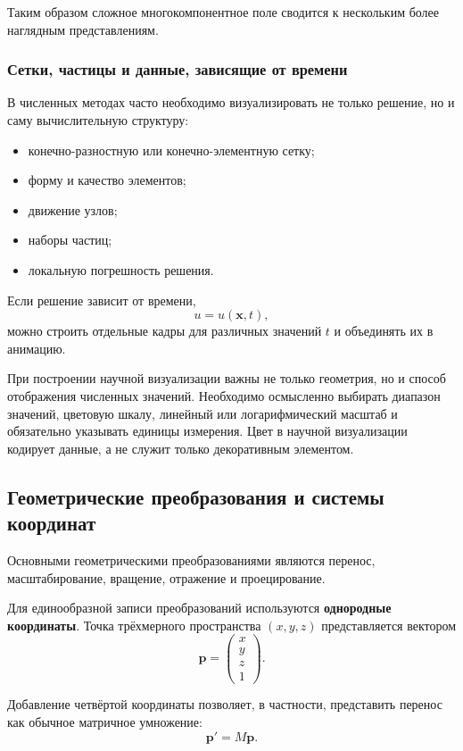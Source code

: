 Таким образом сложное многокомпонентное поле сводится к нескольким более наглядным представлениям.

\subsubsection*{Сетки, частицы и данные, зависящие от времени}

В численных методах часто необходимо визуализировать не только решение, но и саму вычислительную структуру:
\begin{itemize}
	\item конечно-разностную или конечно-элементную сетку;
	\item форму и качество элементов;
	\item движение узлов;
	\item наборы частиц;
	\item локальную погрешность решения.
\end{itemize}

Если решение зависит от времени,
\[
u=u(\mathbf{x},t),
\]
можно строить отдельные кадры для различных значений $t$ и объединять их в анимацию.

При построении научной визуализации важны не только геометрия, но и способ отображения численных значений. Необходимо осмысленно выбирать диапазон значений, цветовую шкалу, линейный или логарифмический масштаб и обязательно указывать единицы измерения. Цвет в научной визуализации кодирует данные, а не служит только декоративным элементом.

\subsection{Геометрические преобразования и системы координат}

Основными геометрическими преобразованиями являются перенос, масштабирование, вращение, отражение и проецирование.

Для единообразной записи преобразований используются \textbf{однородные координаты}. Точка трёхмерного пространства $(x,y,z)$ представляется вектором
\[
\mathbf{p}=
\begin{pmatrix}
	x\\y\\z\\1
\end{pmatrix}.
\]

Добавление четвёртой координаты позволяет, в частности, представить перенос как обычное матричное умножение:
\[
\mathbf{p}'=M\mathbf{p}.
\]

